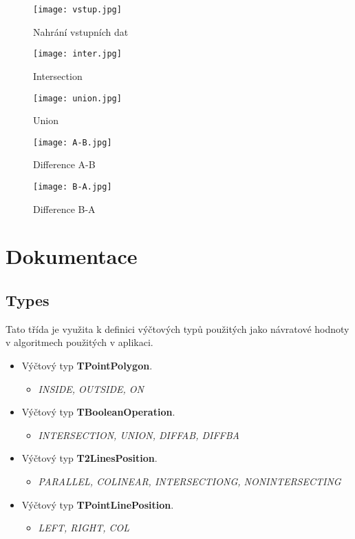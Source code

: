 \documentclass[a4paper, 12pt]{article}
\begin{document}
\begin{figure}[h]
	\centering
	\texttt{[image: vstup.jpg]}
	\caption{Nahrání vstupních dat}
\end{figure}

\begin{figure}[h]
	\centering
	\texttt{[image: inter.jpg]}
	\caption{Intersection}
\end{figure}

\begin{figure}[h]
	\centering
	\texttt{[image: union.jpg]}
	\caption{Union}
\end{figure}

\begin{figure}[h]
	\centering
	\texttt{[image: A-B.jpg]}
	\caption{Difference A-B}
\end{figure}


\begin{figure}[h]
	\centering
	\texttt{[image: B-A.jpg]}
	\caption{Difference B-A}
\end{figure}


\clearpage



\section{Dokumentace}

\subsection{Types}
Tato třída je využita k definici výčtových typů použitých jako návratové hodnoty v algoritmech použitých v aplikaci.
\begin{itemize}
	\item Výčtový typ \textbf{TPointPolygon}.
	\begin{itemize}
		\item \textit{INSIDE, OUTSIDE, ON}
	\end{itemize}
	\item Výčtový typ \textbf{TBooleanOperation}.
	\begin{itemize}
		\item \textit{INTERSECTION, UNION, DIFFAB, DIFFBA}
	\end{itemize}
	\item Výčtový typ \textbf{T2LinesPosition}.
	\begin{itemize}
		\item \textit{PARALLEL, COLINEAR, INTERSECTIONG, NONINTERSECTING}
	\end{itemize}
	\item Výčtový typ \textbf{TPointLinePosition}.
	\begin{itemize}
		\item \textit{LEFT, RIGHT, COL}
	\end{itemize}
\end{itemize}
\end{document}

